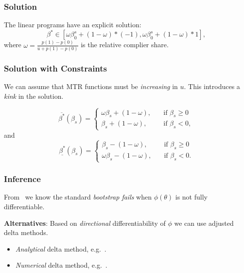 \documentclass[11pt, aspectratio=169]{beamer}
\begin{document}
\begin{frame}
    \frametitle{Solution}
    The linear programs have an explicit solution:
    \begin{equation}
        \beta^* \in [\omega \beta_0^s + (1 - \omega) * (-1), \omega \beta_0^s + (1-\omega) * 1],
    \end{equation}
    where $\omega = \frac{p(1) - p(0)}{\overline{u} + p(1) - p(0)}$ is the relative complier share.
\end{frame}

\begin{frame}
    \frametitle{Solution with Constraints}

    We can assume that MTR functions must be \textit{increasing} in $u$.
    This introduces a \textit{kink} in the solution.

    \begin{equation}
        \overline{\beta^*}(\beta_s)=
        \begin{cases}
            \omega \beta_s + (1 - \omega),& \quad \text{if } \beta_s \geq 0\\
            \beta_s + (1 - \omega),              & \quad \text{if } \beta_s < 0,
        \end{cases}
    \end{equation}
    and
    \begin{equation}
        \underline{\beta^*}(\beta_s)=
        \begin{cases}
            \beta_s - (1 - \omega),& \quad \text{if } \beta_s \geq 0\\
            \omega \beta_s - (1 - \omega),              & \quad \text{if } \beta_s < 0.
        \end{cases}
    \end{equation}

\end{frame}

\begin{frame}
    \frametitle{Inference}

    From~\cite{fang2023inference} we know the standard \textit{bootstrap fails} when $\phi(\theta)$ is not fully differentiable.

    \vspace{0.5cm}

    \textbf{Alternatives}: Based on \textit{directional} differentiability of $\phi$ we can use adjusted delta methods.
    \begin{itemize}
        \item \textit{Analytical} delta method, e.g.~\cite{fang2023inference}.
        \item \textit{Numerical} delta method, e.g.~\cite{hong2018numerical}.
    \end{itemize}


\end{frame}
\end{document}
